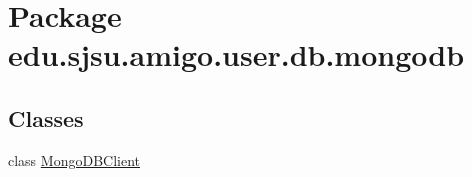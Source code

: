 \hypertarget{namespaceedu_1_1sjsu_1_1amigo_1_1user_1_1db_1_1mongodb}{}\section{Package edu.\+sjsu.\+amigo.\+user.\+db.\+mongodb}
\label{namespaceedu_1_1sjsu_1_1amigo_1_1user_1_1db_1_1mongodb}
\subsection*{Classes}
\begin{DoxyCompactItemize}
\item 
class \hyperlink{classedu_1_1sjsu_1_1amigo_1_1user_1_1db_1_1mongodb_1_1_mongo_d_b_client}{Mongo\+D\+B\+Client}
\end{DoxyCompactItemize}
